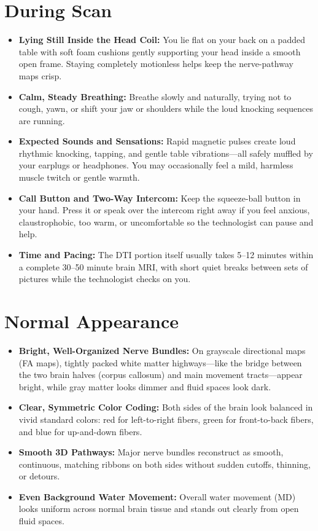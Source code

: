 \section{During Scan}

\begin{itemize}
    \item \textbf{Lying Still Inside the Head Coil:} You lie flat on your back on a padded table with soft foam cushions gently supporting your head inside a smooth open frame. Staying completely motionless helps keep the nerve-pathway maps crisp.
    \item \textbf{Calm, Steady Breathing:} Breathe slowly and naturally, trying not to cough, yawn, or shift your jaw or shoulders while the loud knocking sequences are running.
    \item \textbf{Expected Sounds and Sensations:} Rapid magnetic pulses create loud rhythmic knocking, tapping, and gentle table vibrations---all safely muffled by your earplugs or headphones. You may occasionally feel a mild, harmless muscle twitch or gentle warmth.
    \item \textbf{Call Button and Two-Way Intercom:} Keep the squeeze-ball button in your hand. Press it or speak over the intercom right away if you feel anxious, claustrophobic, too warm, or uncomfortable so the technologist can pause and help.
    \item \textbf{Time and Pacing:} The DTI portion itself usually takes 5--12 minutes within a complete 30--50 minute brain MRI, with short quiet breaks between sets of pictures while the technologist checks on you.
\end{itemize}

\section{Normal Appearance}

\begin{itemize}
    \item \textbf{Bright, Well-Organized Nerve Bundles:} On grayscale directional maps (FA maps), tightly packed white matter highways---like the bridge between the two brain halves (corpus callosum) and main movement tracts---appear bright, while gray matter looks dimmer and fluid spaces look dark.
    \item \textbf{Clear, Symmetric Color Coding:} Both sides of the brain look balanced in vivid standard colors: red for left-to-right fibers, green for front-to-back fibers, and blue for up-and-down fibers.
    \item \textbf{Smooth 3D Pathways:} Major nerve bundles reconstruct as smooth, continuous, matching ribbons on both sides without sudden cutoffs, thinning, or detours.
    \item \textbf{Even Background Water Movement:} Overall water movement (MD) looks uniform across normal brain tissue and stands out clearly from open fluid spaces.
\end{itemize}

